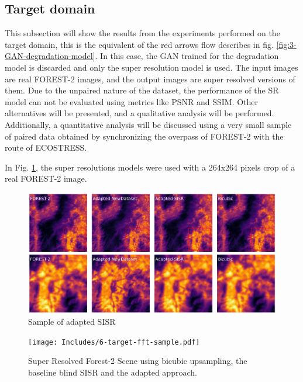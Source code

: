     \pagebreak

        
            
    
    \subsection{Target domain}

        This subsection will show the results from the experiments performed on the target domain, this is the equivalent of the red arrows flow describes in fig. \ref{fig:3-GAN-degradation-model}.
        In this case, the GAN trained for the degradation model is discarded and only the super resolution model is used.
        The input images are real FOREST-2 images, and the output images are super resolved versions of them. 
        Due to the unpaired nature of the dataset, the performance of the SR model can not be evaluated using metrics like PSNR and SSIM. 
        Other alternatives will be presented, and a qualitative analysis will be performed. 
        Additionally, a quantitative analysis will be discussed using a very small sample of paired data obtained by synchronizing the overpass of FOREST-2 with the route of ECOSTRESS.


        In Fig. \ref{fig:5-target_prediction_sample}, the super resolutions models were used with a 264x264 pixels crop of a real FOREST-2 image.
    

        \begin{figure}[H]
            \centering
            \includegraphics[scale=0.28]{Includes/5-target_prediction_sample.pdf}
            \caption{Sample of adapted SISR}
            \label{fig:5-target_prediction_sample}
        \end{figure}


        \begin{figure}[H]
            \centering
            \texttt{[image: Includes/6-target-fft-sample.pdf]}
            \caption{Super Resolved Forest-2 Scene using bicubic upsampling, the baseline blind SISR and the adapted approach.}
            \label{fig:6-target-fft-sample}
        \end{figure}


